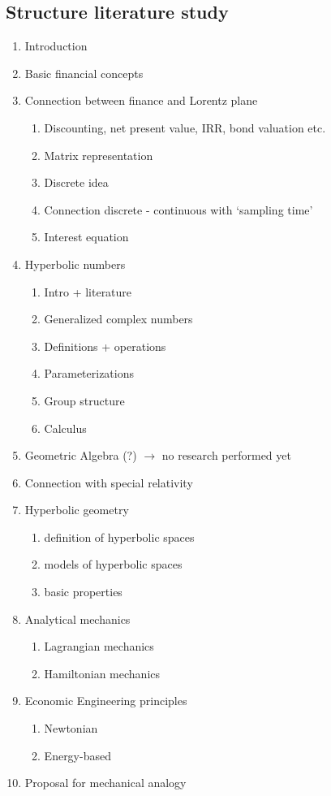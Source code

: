 \subsection*{Structure literature study}
\begin{enumerate}
    \item Introduction
    \item Basic financial concepts
    \item Connection between finance and Lorentz plane 
    \begin{enumerate}
        \item Discounting, net present value, IRR, bond valuation etc.
        \item Matrix representation
        \item Discrete idea
        \item Connection discrete - continuous with `sampling time'
        \item Interest equation
    \end{enumerate}
    \item Hyperbolic numbers
    \begin{enumerate}
        \item Intro + literature
        \item Generalized complex numbers
        \item Definitions + operations
        \item Parameterizations
        \item Group structure
        \item Calculus
    \end{enumerate}
    \item Geometric Algebra (?) $\to$ no research performed yet
    \item Connection with special relativity
    \item Hyperbolic geometry
    \begin{enumerate}
        \item definition of hyperbolic spaces
        \item models of hyperbolic spaces
        \item basic properties
    \end{enumerate}
    \item Analytical mechanics
    \begin{enumerate}
        \item Lagrangian mechanics
        \item Hamiltonian mechanics
    \end{enumerate}
    \item Economic Engineering principles
    \begin{enumerate}
        \item Newtonian
        \item Energy-based
    \end{enumerate}
    \item Proposal for mechanical analogy
\end{enumerate}